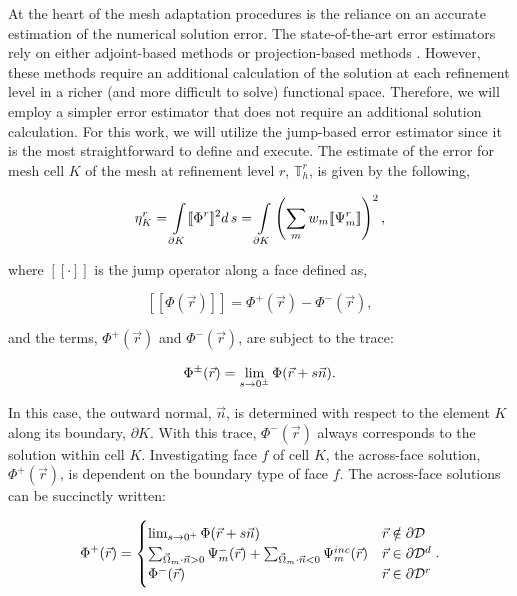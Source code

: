 At the heart of the mesh adaptation procedures is the reliance on an accurate estimation of the numerical solution error. The state-of-the-art error estimators rely on either adjoint-based methods \cite{fuhrer1997posteriori,hartmann2002adaptive,hartmann2003adaptive} or projection-based methods \cite{demkowicz2006computing}. However, these methods require an additional calculation of the solution at each refinement level in a richer (and more difficult to solve) functional space. Therefore, we will employ a simpler error estimator that does not require an additional solution calculation. For this work, we will utilize the jump-based error estimator since it is the most straightforward to define and execute. The estimate of the error for mesh cell $K$ of the mesh at refinement level $r$, $\mathbb{T}_h^r$, is given by the following, 

\begin{equation}
\label{eq::Sn_AMR_jump_err_est}
\eta_K^r = \int\displaylimits_{\partial K} [\![ \Phi^r ]\!]^2 d \, s = \int\displaylimits_{\partial K} \left(  \sum_m w_m [\![ \Psi_m^r ]\!]  \right)^2 ,
\end{equation}

\noindent where $[\![ \cdot ]\!]$ is the jump operator along a face defined as,

\begin{equation}
\label{eq::Sn_AMR_jump_def}
[\![ \Phi (\vec{r}) ]\!] = \Phi^+ (\vec{r}) - \Phi^- (\vec{r}),
\end{equation}

\noindent and the terms, $\Phi^+ (\vec{r})$ and $\Phi^- (\vec{r})$, are subject to the trace:

\begin{equation}
\label{eq::Sn_AMR_jump_trace}
\Phi^{\pm} (\vec{r})  = \lim\displaylimits_{s \rightarrow 0^{\pm}} \Phi (\vec{r} + s \vec{n}).
\end{equation}

\noindent In this case, the outward normal, $\vec{n}$, is determined with respect to the element $K$ along its boundary, $\partial K$. With this trace, $\Phi^- (\vec{r})$ always corresponds to the solution within cell $K$. Investigating face $f$ of cell $K$, the across-face solution, $\Phi^+ (\vec{r})$, is dependent on the boundary type of face $f$. The across-face solutions can be succinctly written:

\begin{equation}
\label{eq::Sn_AMR_across_face_vals}
\Phi^+ (\vec{r}) = 
\begin{cases}
\lim\displaylimits_{s \rightarrow 0^{+}} \Phi (\vec{r} + s \vec{n}) & \vec{r} \notin \partial \mathcal{D} \\
\sum\displaylimits_{\vec{\Omega}_m \cdot \vec{n} > 0}  \Psi_m^- (\vec{r}) + \sum\displaylimits_{\vec{\Omega}_m \cdot \vec{n} < 0} \Psi_{m}^{inc} (\vec{r}) & \vec{r} \in \partial \mathcal{D}^d \\
\Phi^- (\vec{r}) & \vec{r} \in \partial \mathcal{D}^r
\end{cases}.
\end{equation}

